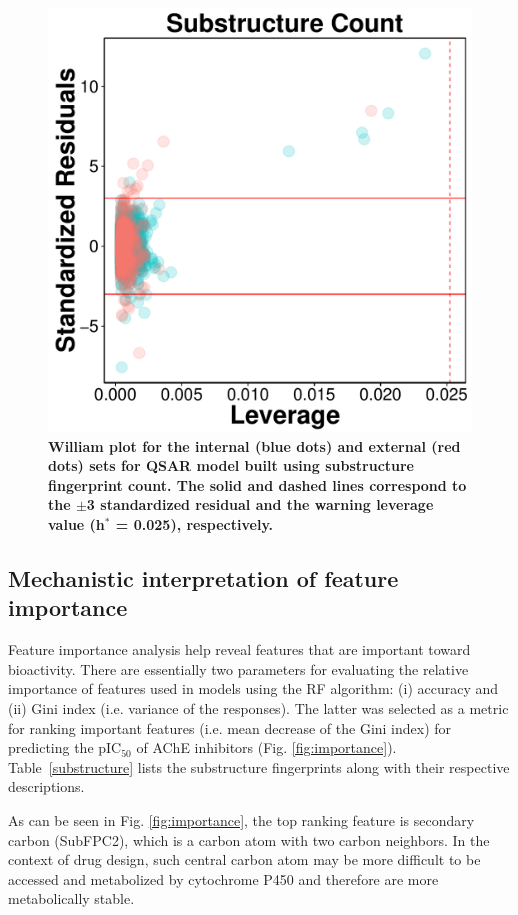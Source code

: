 \documentclass[fleqn,10pt]{wlpeerj}
\begin{document}
\begin{figure}[!ht]
\centering
\includegraphics[width = 0.7\linewidth]{Fig_William_Plot}
\caption{\textbf{William plot for the internal (blue dots) and external (red dots) sets for QSAR model built using substructure fingerprint count. The solid and dashed lines correspond to the $\pm$3 standardized residual and the warning leverage value (h$^*$ = 0.025), respectively. }} 
\label{fig:williams}
\end{figure}




\subsection*{Mechanistic interpretation of feature importance}

Feature importance analysis help reveal features that are important toward bioactivity. There are essentially two parameters for evaluating the relative importance of features used in models using the RF algorithm: (i) accuracy and (ii) Gini index (i.e. variance of the responses). The latter was selected as a metric for ranking important features (i.e. mean decrease of the Gini index) for predicting the pIC$_{50}$ of AChE inhibitors (Fig. \ref{fig:importance}). Table~\ref{substructure} lists the substructure fingerprints along with their respective descriptions. 

As can be seen in Fig. \ref{fig:importance}, the top ranking feature is secondary carbon (SubFPC2), which is a carbon atom with two carbon neighbors. In the context of drug design, such central carbon atom may be more difficult to be accessed and metabolized by cytochrome P450 \citep{uetrecht2007drug} and therefore are more metabolically stable. 
\end{document}
